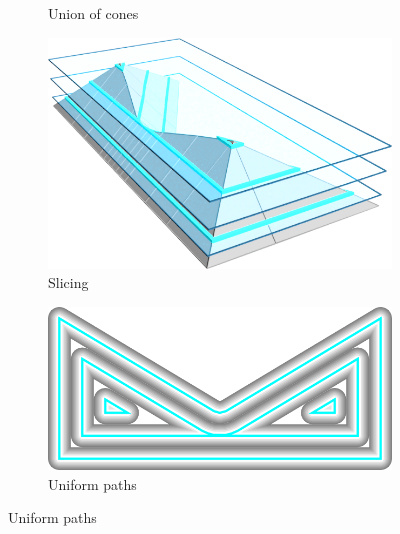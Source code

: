 \begin{figure}
\begin{subfigure}{\figwidthTwo}
\caption{Union of cones}\label{overview_uoc}
\end{subfigure}
\begin{subfigure}{\figwidthTwo}\centering
\hspace*{\tempheightTwo}
\includegraphics[height=\figheight]{sources-method-overview-surface-sliced-naive-cropped.png}
\caption{Slicing}\label{overview_uniform_sliced}
\end{subfigure}
\begin{subfigure}{\figwidth}\centering
\includegraphics[width=\figheight,rotate=-90]{sources-method-overview-2D-naive.png}
\caption{Uniform paths}\label{overview_uniform_paths}
\end{subfigure}



\end{figure}
